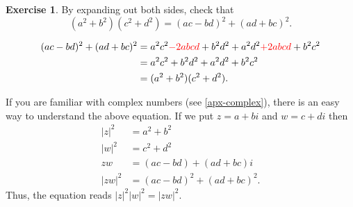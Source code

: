 \documentclass[a4paper]{book}
\newcommand{\RED}[1]{{\color{red}#1}}
\renewcommand{\:}{\colon}
\theoremstyle{definition}
\newtheorem{exercise}[theorem]{Exercise}
\renewenvironment{solution}{\SolutionInline}{\endSolutionInline}
\begin{document}
\begin{exercise}
 By expanding out both sides, check that
 \[ (a^2+b^2)(c^2+d^2) = (ac-bd)^2 + (ad+bc)^2. \]
\end{exercise}
\begin{solution}
 \begin{align*}
  (ac-bd)^2 + (ad+bc)^2 &=
   a^2c^2 \RED{ - 2abcd} + b^2d^2 +
   a^2d^2 \RED{ + 2abcd} + b^2c^2 \\
   &= a^2c^2 + b^2d^2 + a^2d^2 + b^2c^2 \\
   &= (a^2+b^2)(c^2+d^2).
 \end{align*}
\end{solution}
\begin{background}
 If you are familiar with complex numbers (see
 \autoref{apx-complex}), there is an easy way to understand the
 above equation.  If we put $z=a+bi$ and $w=c+di$ then
 \begin{align*}
  |z|^2  &= a^2 + b^2 \\
  |w|^2  &= c^2 + d^2 \\
  zw     &= (ac-bd) + (ad+bc)i \\
  |zw|^2 &= (ac-bd)^2 + (ad+bc)^2.
 \end{align*}
 Thus, the equation reads $|z|^2|w|^2=|zw|^2$.
\end{background}
\end{document}
